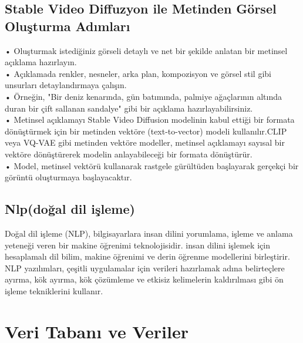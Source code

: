 \documentclass[12pt, a4paper]{article}
\begin{document}
			\subsection{Stable Video Diffuzyon ile Metinden Görsel Oluşturma Adımları}
			•	Oluşturmak istediğiniz görseli detaylı ve net bir şekilde anlatan bir metinsel açıklama hazırlayın.\\
			•	Açıklamada renkler, nesneler, arka plan, kompozisyon ve görsel stil gibi unsurları detaylandırmaya çalışın.\\
			•	Örneğin, "Bir deniz kenarında, gün batımında, palmiye ağaçlarının altında duran bir çift sallanan sandalye" gibi bir açıklama hazırlayabilirsiniz.\\
			•	Metinsel açıklamayı Stable Video Diffusion modelinin kabul ettiği bir formata dönüştürmek için bir metinden vektöre (text-to-vector) modeli kullanılır.CLIP veya VQ-VAE gibi metinden vektöre modeller, metinsel açıklamayı sayısal bir vektöre dönüştürerek modelin anlayabileceği bir formata dönüştürür.\\
			•	Model, metinsel vektörü kullanarak rastgele gürültüden başlayarak gerçekçi bir görüntü oluşturmaya başlayacaktır.\cite{yakar2020yapay}
			
			\subsection{Nlp(doğal dil işleme)}		
			Doğal dil işleme (NLP), bilgisayarlara insan dilini yorumlama, işleme ve anlama yeteneği veren bir makine öğrenimi teknolojisidir. insan dilini işlemek için hesaplamalı dil bilim, makine öğrenimi ve derin öğrenme modellerini birleştirir. NLP yazılımları, çeşitli uygulamalar için verileri hazırlamak adına belirteçlere ayırma, kök ayırma, kök çözümleme ve etkisiz kelimelerin kaldırılması gibi ön işleme tekniklerini kullanır. 
			
			
			\section{Veri Tabanı ve Veriler}
		
\end{document}
